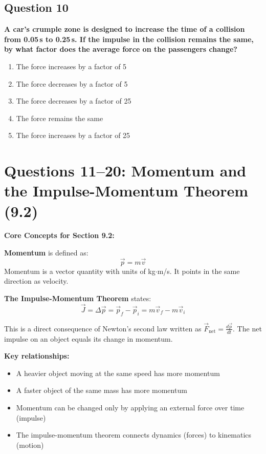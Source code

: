 \documentclass[12pt,letterpaper]{article}
\begin{document}
\subsection{Question 10}

\begin{questionbox}
\textbf{A car's crumple zone is designed to increase the time of a collision from 0.05\,s to 0.25\,s. If the impulse in the collision remains the same, by what factor does the average force on the passengers change?}

\begin{enumerate}[label=\alph*)]
    \item The force increases by a factor of 5
    \item The force decreases by a factor of 5
    \item The force decreases by a factor of 25
    \item The force remains the same
    \item The force increases by a factor of 25
\end{enumerate}
\end{questionbox}

\section{Questions 11--20: Momentum and the Impulse-Momentum Theorem (9.2)}

\begin{conceptbox}
\textbf{Core Concepts for Section 9.2:}

\textbf{Momentum} is defined as:
\[
\vec{p} = m\vec{v}
\]
Momentum is a vector quantity with units of kg$\cdot$m/s. It points in the same direction as velocity.

\textbf{The Impulse-Momentum Theorem} states:
\[
\vec{J} = \Delta\vec{p} = \vec{p}_f - \vec{p}_i = m\vec{v}_f - m\vec{v}_i
\]

This is a direct consequence of Newton's second law written as $\vec{F}_{\text{net}} = \frac{d\vec{p}}{dt}$. The net impulse on an object equals its change in momentum.

\textbf{Key relationships:}
\begin{itemize}
    \item A heavier object moving at the same speed has more momentum
    \item A faster object of the same mass has more momentum
    \item Momentum can be changed only by applying an external force over time (impulse)
    \item The impulse-momentum theorem connects dynamics (forces) to kinematics (motion)
\end{itemize}
\end{conceptbox}
\end{document}

